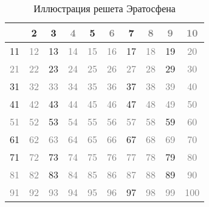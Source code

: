 \documentclass[12pt, a4paper, openany]{book}
\begin{document}
\begin{table}[h]
\centering
\begin{tabular}{|c|c|c|c|c|c|c|c|c|c|}
    \hline
    \textcolor{gray}{} & 2 & 3 & \textcolor{gray}{4} & 5 & \textcolor{gray}{6} & 7 & \textcolor{gray}{8} & \textcolor{gray}{9} & \textcolor{gray}{10} \\
    \hline
    11 & \textcolor{gray}{12} & 13 & \textcolor{gray}{14} & \textcolor{gray}{15} & \textcolor{gray}{16} & 17 & \textcolor{gray}{18} & 19 & \textcolor{gray}{20} \\
    \hline
    \textcolor{gray}{21} & \textcolor{gray}{22} & 23 & \textcolor{gray}{24} & \textcolor{gray}{25} & \textcolor{gray}{26} & \textcolor{gray}{27} & \textcolor{gray}{28} & 29 & \textcolor{gray}{30} \\
    \hline
    31 & \textcolor{gray}{32} & \textcolor{gray}{33} & \textcolor{gray}{34} & \textcolor{gray}{35} & \textcolor{gray}{36} & 37 & \textcolor{gray}{38} & \textcolor{gray}{39} & \textcolor{gray}{40} \\
    \hline
    41 & \textcolor{gray}{42} & 43 & \textcolor{gray}{44} & \textcolor{gray}{45} & \textcolor{gray}{46} & 47 & \textcolor{gray}{48} & \textcolor{gray}{49} & \textcolor{gray}{50} \\
    \hline
    \textcolor{gray}{51} & \textcolor{gray}{52} & 53 & \textcolor{gray}{54} & \textcolor{gray}{55} & \textcolor{gray}{56} & \textcolor{gray}{57} & \textcolor{gray}{58} & 59 & \textcolor{gray}{60} \\
    \hline
    61 & \textcolor{gray}{62} & \textcolor{gray}{63} & \textcolor{gray}{64} & \textcolor{gray}{65} & \textcolor{gray}{66} & 67 & \textcolor{gray}{68} & \textcolor{gray}{69} & \textcolor{gray}{70} \\
    \hline
    71 & \textcolor{gray}{72} & 73 & \textcolor{gray}{74} & \textcolor{gray}{75} & \textcolor{gray}{76} & \textcolor{gray}{77} & \textcolor{gray}{78} & 79 & \textcolor{gray}{80} \\
    \hline
    \textcolor{gray}{81} & \textcolor{gray}{82} & 83 & \textcolor{gray}{84} & \textcolor{gray}{85} & \textcolor{gray}{86} & \textcolor{gray}{87} & \textcolor{gray}{88} & 89 & \textcolor{gray}{90} \\
    \hline
    \textcolor{gray}{91} & \textcolor{gray}{92} & \textcolor{gray}{93} & \textcolor{gray}{94} & \textcolor{gray}{95} & \textcolor{gray}{96} & 97 & \textcolor{gray}{98} & \textcolor{gray}{99} & \textcolor{gray}{100} \\
    \hline
    \end{tabular}
    \caption{Иллюстрация решета Эратосфена}
\end{table}
\end{document}
